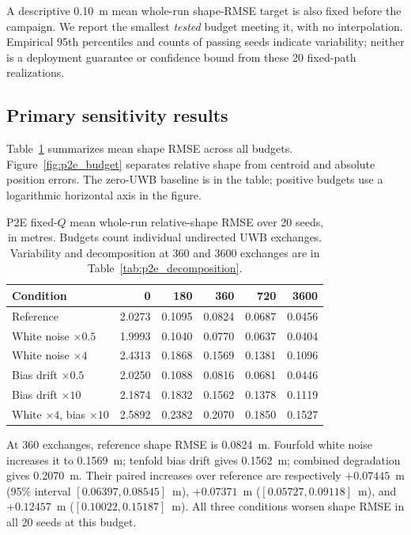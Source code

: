 A descriptive \SI{0.10}{m} mean whole-run shape-RMSE target is also fixed before the campaign. We report the smallest \emph{tested} budget meeting it, with no interpolation. Empirical 95th percentiles and counts of passing seeds indicate variability; neither is a deployment guarantee or confidence bound from these 20 fixed-path realizations.

\subsection{Primary sensitivity results}
Table~\ref{tab:p2e_shape} summarizes mean shape RMSE across all budgets. Figure~\ref{fig:p2e_budget} separates relative shape from centroid and absolute position errors. The zero-UWB baseline is in the table; positive budgets use a logarithmic horizontal axis in the figure.
\begin{table}[htbp]
\centering\small
\caption{P2E fixed-\(Q\) mean whole-run relative-shape RMSE over 20 seeds, in metres. Budgets count individual undirected UWB exchanges. Variability and decomposition at 360 and 3600 exchanges are in Table~\ref{tab:p2e_decomposition}.}
\label{tab:p2e_shape}
\begin{tabular}{lrrrrr}
\toprule
Condition & 0 & 180 & 360 & 720 & 3600 \\
\midrule
Reference & 2.0273 & 0.1095 & 0.0824 & 0.0687 & 0.0456 \\
White noise $\times0.5$ & 1.9993 & 0.1040 & 0.0770 & 0.0637 & 0.0404 \\
White noise $\times4$ & 2.4313 & 0.1868 & 0.1569 & 0.1381 & 0.1096 \\
Bias drift $\times0.5$ & 2.0250 & 0.1088 & 0.0816 & 0.0681 & 0.0446 \\
Bias drift $\times10$ & 2.1874 & 0.1832 & 0.1562 & 0.1378 & 0.1119 \\
White $\times4$, bias $\times10$ & 2.5892 & 0.2382 & 0.2070 & 0.1850 & 0.1527 \\
\bottomrule
\end{tabular}
\end{table}

At 360 exchanges, reference shape RMSE is \SI{0.0824}{m}. Fourfold white noise increases it to \SI{0.1569}{m}; tenfold bias drift gives \SI{0.1562}{m}; combined degradation gives \SI{0.2070}{m}. Their paired increases over reference are respectively \(+0.07445\)~m (95\% interval \([0.06397,0.08545]\)~m), \(+0.07371\)~m (\([0.05727,0.09118]\)~m), and \(+0.12457\)~m (\([0.10022,0.15187]\)~m). All three conditions worsen shape RMSE in all 20 seeds at this budget.

